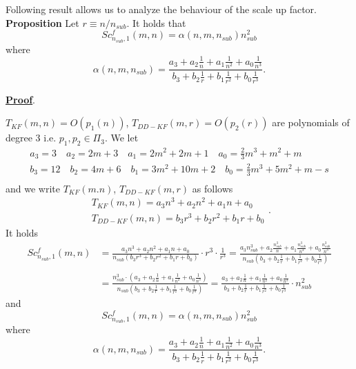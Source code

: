 \noindent Following result allows us to analyze the behaviour of the scale up factor.\\


\noindent \textbf{Proposition}
Let  $r \equiv n/n_{sub}$. It holds that
\begin{equation}\label{factor_alfa}
Sc^f_{n_{sub},1}(m,n)=\alpha(n,m,n_{sub})n_{sub}^{2}
\end{equation} 
where
\begin{equation}
\alpha(n,m,n_{sub})=\frac{a_{3}+a_{2}\frac{1}{n}+a_{1}\frac{1}{n^{2}}+a_{0}\frac{1}{n^{3}}}{b_{3}+b_{2}\frac{1}{r}+b_{1}\frac{1}{r^{2}}+b_{0}\frac{1}{r^{3}}}.
\end{equation}


\noindent \underline{\bf Proof}.

$T_{KF}(m,n)=O(p_{1}(n))$, $T_{DD-KF}(m,r)=O(p_{2}(r))$ are polynomials of degree 3 i.e. $p_{1},p_{2}\in \Pi_{3}$. We let
\begin{equation}\label{coeff}
\begin{array}{ll}
a_{3}=3 \quad a_{2}=2m+3 \quad a_{1}=2m^{2}+2m+1 \quad a_{0}=\frac{2}{3}m^{3}+m^{2}+m\\
b_{3}=12 \quad b_{2}=4m+6 \quad b_{1}=3m^{2}+10m+2 \quad b_{0}=\frac{2}{3}m^{3}+5m^{2}+m-s\\
\end{array}
\end{equation}
and we write $T_{KF}(m.n)$, $T_{DD-KF}(m,r)$ as follows
\begin{equation}
\begin{array}{ll}
T_{KF}(m,n)=a_{3}n^{3}+a_{2}n^{2}+a_{1}n+a_{0}\\
T_{DD-KF}(m,n)=b_{3}r^{3}+b_{2}r^{2}+b_{1}r+b_{0}
\end{array}.
\end{equation}
It holds
\begin{equation}
\begin{array}{ll}
Sc^f_{n_{sub},1}(m,n)&=\frac{a_{3}n^{3}+a_{2}n^{2}+a_{1}n+a_{0}}{n_{sub}(b_{3}r^{3}+b_{2}r^{2}+b_{1}r+b_{0})}\cdot r^{3}\cdot \frac{1}{r^{3}}=\frac{a_{3}n_{sub}^{3}+a_{2}\frac{n_{sub}^{3}}{n}+a_{1}\frac{n_{sub}^{3}}{n^{2}}+a_{0}\frac{n_{sub}^{3}}{n^{3}}}{n_{sub}(b_{3}+b_{2}\frac{1}{r}+b_{1}\frac{1}{r^{2}}+b_{0}\frac{1}{r^{3}})}\\
\\
&=\frac{n_{sub}^{3}\cdot(a_{3}+a_{2}\frac{1}{n}+a_{1}\frac{1}{n^{2}}+a_{0}\frac{1}{n^{3}})}{n_{sub}(b_{3}+b_{2}\frac{1}{r}+b_{1}\frac{1}{r^{2}}+b_{0}\frac{1}{r^{3}})}=\frac{a_{3}+a_{2}\frac{1}{n}+a_{1}\frac{1}{n^{2}}+a_{0}\frac{1}{n^{3}}}{b_{3}+b_{2}\frac{1}{r}+b_{1}\frac{1}{r^{2}}+b_{0}\frac{1}{r^{3}}}\cdot n_{sub}^{2}
\end{array}
\end{equation}
and 
\begin{equation}\label{factor_alfa2}
Sc^f_{n_{sub},1}(m,n)=\alpha(n,m,n_{sub})n_{sub}^{2}
\end{equation} 
where
\begin{equation}
\alpha(n,m,n_{sub})=\frac{a_{3}+a_{2}\frac{1}{n}+a_{1}\frac{1}{n^{2}}+a_{0}\frac{1}{n^{3}}}{b_{3}+b_{2}\frac{1}{r}+b_{1}\frac{1}{r^{2}}+b_{0}\frac{1}{r^{3}}}.
\end{equation}


